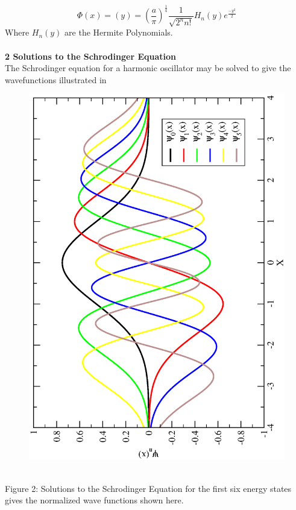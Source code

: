 \documentclass{article}
\begin{document}
\begin{equation}
\label{eq:normalized}
\Phi(x)=(y)=(\frac{a}{\pi})^{\frac{1}{4}}\dfrac{1}{\sqrt{2^n n!}}H_n(y)e^\frac{-y^2}{2}
\end{equation}
Where $H_n(y)$ are the Hermite Polynomials.
\\
\\
\noindent\textbf{2  Solutions to the Schrodinger Equation}
\\
The Schrodinger equation for a harmonic oscillator may be solved to give the wavefunctions illustrated in
\begin{figure}[ht]
\begin{center}
\includegraphics[scale=.5,angle=-90]{hermite.ps}
\label{fig:hermite}
\end{center}
\end{figure}
\\
Figure 2: Solutions to the Schrodinger Equation for the first six energy states gives the normalized wave functions shown here.
\end{document}
